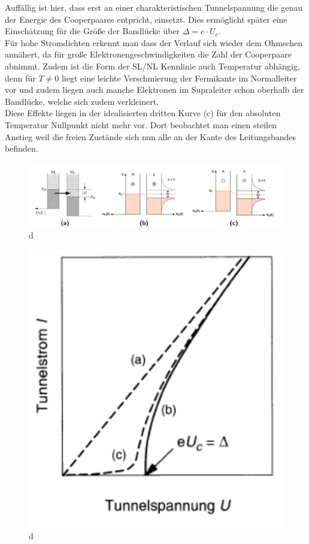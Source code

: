 \documentclass[twoside,        %
               BCOR12mm,       %
               english,ngerman, %
               fleqn,headsepline=false,footsepline=false
              ]{MFPREPORT}
\begin{document}
Auffällig ist hier, dass erst an einer charakteristischen Tunnelspannung die genau der Energie des Cooperpaares entpricht, einsetzt. Dies ermöglicht später eine Einschätzung für die Größe der Bandlücke  über $\Delta= e \cdot U_c$. 
\\
Für hohe Stromdichten erkennt man dass der Verlauf sich wieder dem Ohmschen annähert, da für große Elektronengeschwindigkeiten  die Zahl der Cooperpaare abnimmt. Zudem ist die Form der SL/NL Kennlinie auch Temperatur abhängig, denn für $T  \neq 0$ liegt eine leichte Verschmierung der Fermikante im Normalleiter vor und zudem liegen auch manche Elektronen im Supraleiter schon oberhalb der Bandlücke, welche sich zudem verkleinert.
\\
Diese Effekte liegen in der idealisierten dritten Kurve (c) für den absoluten Temperatur Nullpunkt nicht mehr vor.
Dort beobachtet man einen steilen Anstieg weil die freien Zustände sich nun alle an der Kante des Leitungsbandes befinden. 




\begin{figure}[h]
\includegraphics[scale=0.5]{tunnel.png}
\caption{d}
\label{fig:tunnel1}
\end{figure}

\begin{figure}[h]
\includegraphics[scale=0.5]{kennlinie.png}
\caption{d}
\label{fig:tunnel2}
\end{figure}
\end{document}
